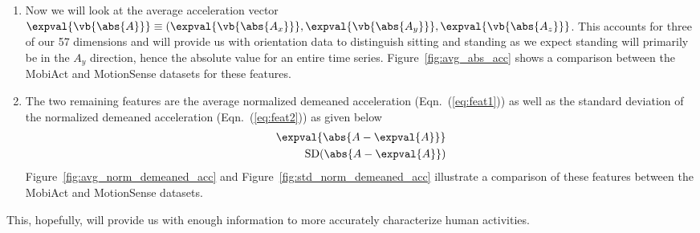 \begin{enumerate}
    \item Now we will look at the average acceleration vector $\expval{\vb{\abs{A}}} \equiv (\expval{\vb{\abs{A_x}}}, \expval{\vb{\abs{A_y}}}, \expval{\vb{\abs{A_z}}}$. This accounts for three of our 57 dimensions and will provide us with orientation data to distinguish sitting and standing as we expect standing will primarily be in the $A_y$ direction, hence the absolute value for an entire time series. Figure~\ref{fig:avg_abs_acc} shows a comparison between the MobiAct and MotionSense datasets for these features.
    
    \item The two remaining features are the average normalized demeaned acceleration (Eqn.~(\ref{eq:feat1})) as well as the standard deviation of the normalized demeaned acceleration (Eqn.~(\ref{eq:feat2})) as given below \begin{align}
        \expval{\abs{A - \expval{A}}} \label{eq:feat1} \\
        \mathrm{SD}({\abs{A - \expval{A}}})  \label{eq:feat2}
    \end{align}
    Figure~\ref{fig:avg_norm_demeaned_acc} and Figure~\ref{fig:std_norm_demeaned_acc} illustrate a comparison of these features between the MobiAct and MotionSense datasets.
\end{enumerate}
This, hopefully, will provide us with enough information to more accurately characterize human activities. 


